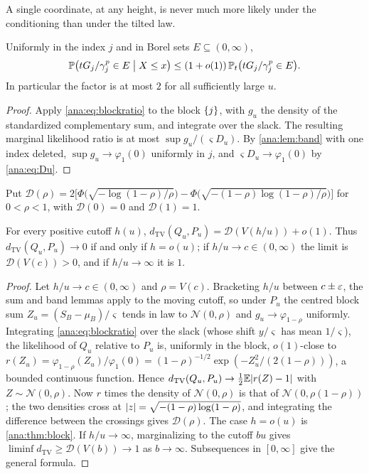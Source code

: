 A single coordinate, at any height, is never much more likely under the conditioning than under the
tilted law.

\begin{lemma}\label{ana:lem:margdom}
Uniformly in the index $j$ and in Borel sets $E\subseteq(0,\infty)$,
\[
 \mathbb{P}\bigl(tG_j/\gamma_j^p\in E\bigm| X\le x\bigr)\le(1+o(1))\,\mathbb{P}_t\bigl(tG_j/\gamma_j^p\in E\bigr).
\]
In particular the factor is at most $2$ for all sufficiently large $u$.
\end{lemma}

\begin{proof}
Apply \eqref{ana:eq:blockratio} to the block $\{j\}$, with $g_u$ the density of the standardized
complementary sum, and integrate over the slack. The resulting marginal likelihood ratio is at most
$\sup g_u/(\varsigma D_u)$. By \cref{ana:lem:band} with one index deleted, $\sup g_u\to\varphi_1(0)$
uniformly in $j$, and $\varsigma D_u\to\varphi_1(0)$ by \eqref{ana:eq:Du}.
\end{proof}

Put $\mathcal D(\rho)=2\bigl[\Phi\bigl(\sqrt{-\log(1-\rho)/\rho}\bigr)-
\Phi\bigl(\sqrt{-(1-\rho)\log(1-\rho)/\rho}\bigr)\bigr]$ for $0<\rho<1$, with $\mathcal D(0)=0$ and
$\mathcal D(1)=1$.

\begin{theorem}\label{ana:thm:macro}
For every positive cutoff $h(u)$, $d_{\mathrm{TV}}(Q_u,P_u)=\mathcal D(V(h/u))+o(1)$. Thus
$d_{\mathrm{TV}}(Q_u,P_u)\to0$ if and only if $h=o(u)$; if $h/u\to c\in(0,\infty)$ the limit is
$\mathcal D(V(c))>0$, and if $h/u\to\infty$ it is $1$.
\end{theorem}

\begin{proof}
Let $h/u\to c\in(0,\infty)$ and $\rho=V(c)$. Bracketing $h/u$ between $c\pm\varepsilon$, the sum and band
lemmas apply to the moving cutoff, so under $P_u$ the centred block sum $Z_u=(S_B-\mu_B)/\varsigma$
tends in law to $\mathcal N(0,\rho)$ and $g_u\to\varphi_{1-\rho}$ uniformly. Integrating
\eqref{ana:eq:blockratio} over the slack (whose shift $y/\varsigma$ has mean $1/\varsigma$), the
likelihood of $Q_u$ relative to $P_u$ is, uniformly in the block, $o(1)$-close to
$r(Z_u)=\varphi_{1-\rho}(Z_u)/\varphi_1(0)=(1-\rho)^{-1/2}\exp(-Z_u^2/(2(1-\rho)))$, a bounded continuous
function. Hence $d_{\mathrm{TV}}(Q_u,P_u)\to\frac12\mathbb{E}\lvert r(Z)-1\rvert$ with $Z\sim\mathcal N(0,\rho)$. Now
$r$ times the density of $\mathcal N(0,\rho)$ is that of $\mathcal N(0,\rho(1-\rho))$; the two densities
cross at $\lvert z\rvert=\sqrt{-(1-\rho)\log(1-\rho)}$, and integrating the difference between the crossings
gives $\mathcal D(\rho)$. The case $h=o(u)$ is \cref{ana:thm:block}. If $h/u\to\infty$, marginalizing to
the cutoff $bu$ gives $\liminf d_{\mathrm{TV}}\ge\mathcal D(V(b))\to1$ as $b\to\infty$. Subsequences in
$[0,\infty]$ give the general formula.
\end{proof}

